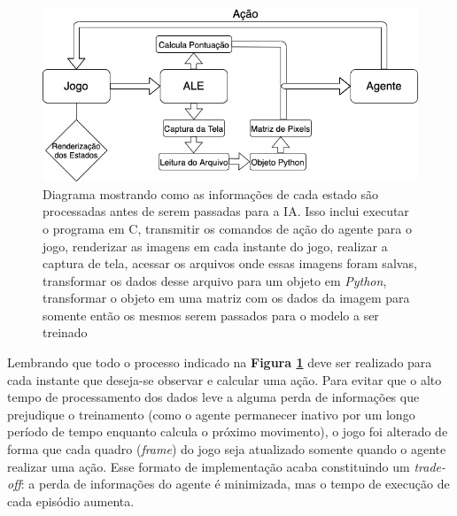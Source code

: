 \begin{figure}[h]
  \centering
  \includegraphics[width=.8 \textwidth]{conteudo/imgs/processamento_imgs.png}
  \caption[Diagrama de processamento de imagens]{Diagrama mostrando como as informações de cada estado são processadas antes de serem passadas para a IA. Isso inclui executar o programa em C, transmitir os comandos de ação do agente para o jogo, renderizar as imagens em cada instante do jogo, realizar a captura de tela, acessar os arquivos onde essas imagens foram salvas, transformar os dados desse arquivo para um objeto em \textit{Python}, transformar o objeto em uma matriz com os dados da imagem para somente então os mesmos serem passados para o modelo a ser treinado}
  \label{fig:process_img}
\end{figure} 

Lembrando que todo o processo indicado na \textbf{Figura \ref{fig:process_img}} deve ser realizado para cada instante que deseja-se observar e calcular uma ação. Para evitar que o alto tempo de processamento dos dados leve a alguma perda de informações que prejudique o treinamento (como o agente permanecer inativo por um longo período de tempo enquanto calcula o próximo movimento), o jogo foi alterado de forma que cada quadro (\textit{frame}) do jogo seja atualizado somente quando o agente realizar uma ação. Esse formato de implementação acaba constituindo um \textit{trade-off}: a perda de informações do agente é minimizada, mas o tempo de execução de cada episódio aumenta.


